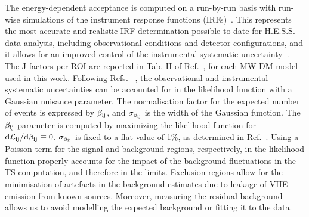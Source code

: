 \documentclass[aps,prl,twocolumn,floats,balancelastpage,showpacs,showkeys,preprintnumbers,floatfix,nofootinbib,superscriptaddress, longbibliography]{revtex4-1}
\begin{document}
The energy-dependent acceptance is computed on a run-by-run basis with run-wise simulations of the instrument response functions (IRFs)~\cite{Holler:2020duc}. This represents the most accurate and realistic IRF determination possible to date for H.E.S.S. data analysis, including observational conditions and detector configurations, and it allows for an improved control of the instrumental systematic uncertainty~\cite{Holler:2020duc}. The J-factors per ROI are reported in Tab. II of Ref.~\cite{supplement}, for each MW DM model used in this work. Following Refs. ~\cite{Silverwood:2014yza,Lefranc:2015pza,Moulin:2019oyc,HESS:2022ygk,Montanari:2022buj}, the observational and instrumental systematic uncertainties can be accounted for in the likelihood function with a Gaussian nuisance parameter. The normalisation factor for the expected number of events is expressed by $\beta_{\rm ij}$, and $\sigma_{\beta_{\rm ij}}$ is the width of the Gaussian function. The $\beta_{\rm ij}$ parameter is computed by maximizing the likelihood function for $\rm d\mathcal{L}_{\rm ij}/d \beta_{\rm ij} \equiv 0$. $\sigma_{\beta_{\rm ij}}$ is fixed to a flat value of 1\%, as determined in Ref.~\cite{HESS:2022ygk}. Using a Poisson term for the signal and background regions, respectively, in the likelihood function properly accounts for the impact of the background fluctuations in the TS computation, and therefore in the limits. Exclusion regions allow for the minimisation of artefacts in the background estimates due to leakage of VHE emission from known sources. Moreover, measuring the residual background allows us to avoid modelling the expected background or fitting it to the data.
\end{document}
